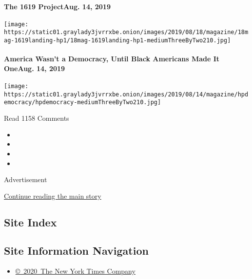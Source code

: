 \hypertarget{the-1619-projectaug-14-2019-1}{%
\paragraph{The 1619 ProjectAug. 14,
2019}\label{the-1619-projectaug-14-2019-1}}

\texttt{[image: https://static01.graylady3jvrrxbe.onion/images/2019/08/18/magazine/18mag-1619landing-hp1/18mag-1619landing-hp1-mediumThreeByTwo210.jpg]}
\href{https://www.nytimes3xbfgragh.onion/interactive/2019/08/14/magazine/black-history-american-democracy.html}{}

\hypertarget{america-wasnt-a-democracy-until-black-americans-made-it-oneaug-14-2019-1}{%
\paragraph{America Wasn't a Democracy, Until Black Americans Made It
OneAug. 14,
2019}\label{america-wasnt-a-democracy-until-black-americans-made-it-oneaug-14-2019-1}}

\texttt{[image: https://static01.graylady3jvrrxbe.onion/images/2019/08/14/magazine/hpdemocracy/hpdemocracy-mediumThreeByTwo210.jpg]}

Read 1158 Comments

\begin{itemize}
\item
\item
\item
\item
\end{itemize}

Advertisement

\protect\hyperlink{after-bottom}{Continue reading the main story}

\hypertarget{site-index}{%
\subsection{Site Index}\label{site-index}}

\hypertarget{site-information-navigation}{%
\subsection{Site Information
Navigation}\label{site-information-navigation}}

\begin{itemize}
\tightlist
\item
  \href{https://help.nytimes3xbfgragh.onion/hc/en-us/articles/115014792127-Copyright-notice}{©~2020~The
  New York Times Company}
\end{itemize}

